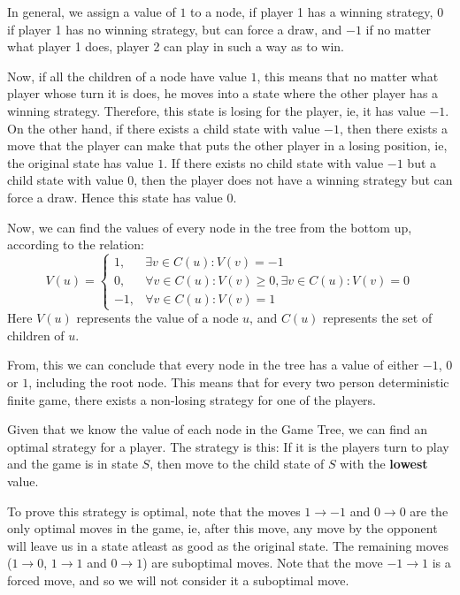 \documentclass[12pt]{report}
\begin{document}
In general, we assign a value of $1$ to a node, if player 1 has a winning strategy, $0$ if player 1 has no winning strategy, but can force a draw, and $-1$ if no matter what player 1 does, player 2 can play in such a way as to win.

Now, if all the children of a node have value $1$, this means that no matter what player whose turn it is does, he moves into a state where the other player has a winning strategy.
Therefore, this state is losing for the player, ie, it has value $-1$. On the other hand, if there exists a child state with value $-1$, then there exists a move that the player can make
that puts the other player in a losing position, ie, the original state has value $1$. If there exists no child state with value $-1$ but a child state with value $0$, then the player does not have 
a winning strategy but can force a draw. Hence this state has value $0$.

Now, we can find the values of every node in the tree from the bottom up, according to the relation:
\begin{equation}
    V(u) = \begin{cases}
        1, & \exists v \in C(u): V(v) = -1\\
        0, & \forall v \in C(u): V(v) \geq 0, \exists v \in C(u): V(v) = 0 \\
        -1, & \forall v \in C(u): V(v) = 1
    \end{cases}
\end{equation}
Here $V(u)$ represents the value of a node $u$, and $C(u)$ represents the set of children of $u$.

From, this we can conclude that every node in the tree has a value of either $-1$, $0$ or $1$, including the root node. This means that for 
every two person deterministic finite game, there exists a non-losing strategy for one of the players. 

Given that we know the value of each node in the Game Tree, we can find an optimal strategy for a player.
The strategy is this: If it is the players turn to play and the game is in state $S$, then move to the child state of $S$ with the \textbf{lowest} value.

To prove this strategy is optimal, note that the moves $1 \rightarrow -1$ and $0 \rightarrow 0$ are the only optimal moves in the game, ie, after this
move, any move by the opponent will leave us in a state atleast as good as the original state. The remaining moves ($1 \rightarrow 0$, $1 \rightarrow 1$ and $0 \rightarrow 1$) are
suboptimal moves. Note that the move $-1 \rightarrow 1$ is a forced move, and so we will not consider it a suboptimal move.
\end{document}

